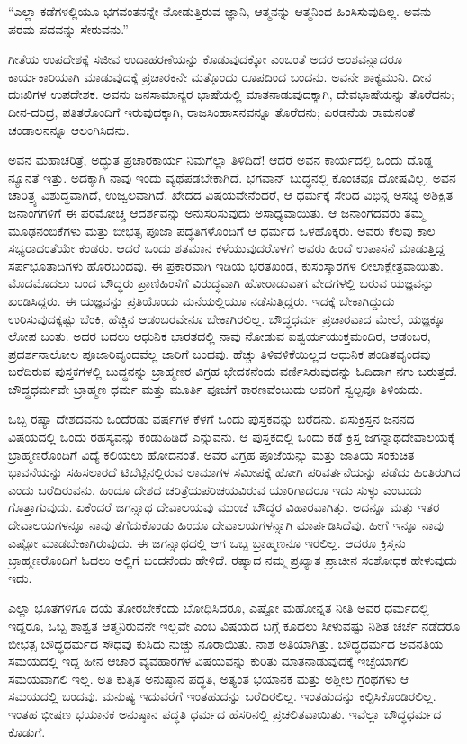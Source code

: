 “ಎಲ್ಲಾ ಕಡೆಗಳಲ್ಲಿಯೂ ಭಗವಂತನನ್ನೇ ನೋಡುತ್ತಿರುವ ಜ್ಞಾನಿ, ಆತ್ಮನನ್ನು ಆತ್ಮನಿಂದ ಹಿಂಸಿಸುವುದಿಲ್ಲ. ಅವನು ಪರಮ ಪದವನ್ನು ಸೇರುವನು.”

ಗೀತೆಯ ಉಪದೇಶಕ್ಕೆ ಸಜೀವ ಉದಾಹರಣೆಯನ್ನು ಕೊಡುವುದಕ್ಕೋ ಎಂಬಂತೆ ಅದರ ಅಂಶವನ್ನಾದರೂ ಕಾರ್ಯಕಾರಿಯಾಗಿ ಮಾಡುವುದಕ್ಕೆ ಪ್ರಚಾರಕನೇ ಮತ್ತೊಂದು ರೂಪದಿಂದ ಬಂದನು. ಅವನೇ ಶಾಕ್ಯಮುನಿ. ದೀನ ದುಃಖಿಗಳ ಉಪದೇಶಕ. ಅವನು ಜನಸಾಮಾನ್ಯರ ಭಾಷೆಯಲ್ಲಿ ಮಾತನಾಡುವುದಕ್ಕಾಗಿ, ದೇವಭಾಷೆಯನ್ನು ತೊರೆದನು; ದೀನ-ದರಿದ್ರ, ಪತಿತರೊಂದಿಗೆ ಇರುವುದಕ್ಕಾಗಿ, ರಾಜಸಿಂಹಾಸನವನ್ನೂ ತೊರೆದನು; ಎರಡನೆಯ ರಾಮನಂತೆ ಚಂಡಾಲನನ್ನೂ ಆಲಂಗಿಸಿದನು.

ಅವನ ಮಹಾಚರಿತ್ರೆ, ಅದ್ಭುತ ಪ್ರಚಾರಕಾರ್ಯ ನಿಮಗೆಲ್ಲಾ ತಿಳಿದಿದೆ! ಆದರೆ ಅವನ ಕಾರ್ಯದಲ್ಲಿ ಒಂದು ದೊಡ್ಡ ನ್ಯೂನತೆ ಇತ್ತು. ಅದಕ್ಕಾಗಿ ನಾವು ಇಂದು ವ್ಯಥೆಪಡಬೇಕಾಗಿದೆ. ಭಗವಾನ್​ ಬುದ್ಧನಲ್ಲಿ ಕೊಂಚವೂ ದೋಷವಿಲ್ಲ. ಅವನ ಚಾರಿತ್ರ್ಯ ವಿಶುದ್ಧವಾಗಿದೆ, ಉಜ್ವಲವಾಗಿದೆ. ಖೇದದ ವಿಷಯವೇನೆಂದರೆ, ಆ ಧರ್ಮಕ್ಕೆ ಸೇರಿದ ವಿಭಿನ್ನ ಅಸಭ್ಯ ಅಶಿಕ್ಷಿತ ಜನಾಂಗಗಳಿಗೆ ಈ ಪರಮೋಚ್ಚ ಆದರ್ಶವನ್ನು ಅನುಸರಿಸುವುದು ಅಸಾಧ್ಯವಾಯಿತು. ಆ ಜನಾಂಗದವರು ತಮ್ಮ ಮೂಢನಂಬಿಕೆಗಳು ಮತ್ತು ಬೀಭತ್ಸ ಪೂಜಾ ಪದ್ಧತಿಗಳೊಂದಿಗೆ ಆ ಧರ್ಮದ ಒಳಹೊಕ್ಕರು. ಅವರು ಕೆಲವು ಕಾಲ ಸಭ್ಯ\-ರಾದಂತೆಯೇ ಕಂಡರು. ಆದರೆ ಒಂದು ಶತಮಾನ ಕಳೆಯುವುದರೊಳಗೆ ಅವರು ಹಿಂದೆ ಉಪಾಸನೆ ಮಾಡುತ್ತಿದ್ದ ಸರ್ಪಭೂತಾದಿಗಳು ಹೊರಬಂದವು. ಈ ಪ್ರಕಾರವಾಗಿ ಇಡಿಯ ಭರತಖಂಡ, ಕುಸಂಸ್ಕಾರಗಳ ಲೀಲಾಕ್ಷೇತ್ರವಾಯಿತು. ಮೊದಮೊದಲು ಬಂದ ಬೌದ್ಧರು ಪ್ರಾಣಿಹಿಂಸೆಗೆ ವಿರುದ್ಧವಾಗಿ ಹೋರಾಡುವಾಗ ವೇದಗಳಲ್ಲಿ ಬರುವ ಯಜ್ಞವನ್ನು ಖಂಡಿಸಿದ್ದರು. ಈ ಯಜ್ಞವನ್ನು ಪ್ರತಿಯೊಂದು ಮನೆಯಲ್ಲಿಯೂ ನಡೆಸುತ್ತಿದ್ದರು. ಇದಕ್ಕೆ ಬೇಕಾಗಿದ್ದುದು ಉರಿಸುವುದಕ್ಕಷ್ಟು ಬೆಂಕಿ, ಹೆಚ್ಚಿನ ಆಡಂಬರವೇನೂ ಬೇಕಾಗಿರಲಿಲ್ಲ. ಬೌದ್ಧಧರ್ಮ ಪ್ರಚಾರವಾದ ಮೇಲೆ, ಯಜ್ಞಕ್ಕೂ ಲೋಪ ಬಂತು. ಅದರ ಬದಲು ಆಧುನಿಕ ಭಾರತದಲ್ಲಿ ನಾವು ನೋಡುವ ಐಶ್ವರ್ಯಯುಕ್ತಮಂದಿರ, ಆಡಂಬರ, ಪ್ರದರ್ಶನಾಲೋಲ ಪೂಜಾರಿವೃಂದವೆಲ್ಲ ಜಾರಿಗೆ ಬಂದವು. ಹೆಚ್ಚು ತಿಳಿವಳಿಕೆಯಿಲ್ಲದ ಆಧುನಿಕ ಪಂಡಿತವೃಂದವು ಬರೆದಿರುವ ಪುಸ್ತಕಗಳಲ್ಲಿ ಬುದ್ಧನನ್ನು ಬ್ರಾಹ್ಮಣರ ವಿಗ್ರಹ ಭೇದಕನೆಂದು ವರ್ಣಿಸಿರುವುದನ್ನು ಓದಿದಾಗ ನಗು ಬರುತ್ತದೆ. ಬೌದ್ಧಧರ್ಮವೇ ಬ್ರಾಹ್ಮಣ ಧರ್ಮ ಮತ್ತು ಮೂರ್ತಿ ಪೂಜೆಗೆ ಕಾರಣವೆಂಬುದು ಅವರಿಗೆ ಸ್ವಲ್ಪವೂ ತಿಳಿಯದು.

ಒಬ್ಬ ರಷ್ಯಾ ದೇಶದವನು ಒಂದೆರಡು ವರ್ಷಗಳ ಕೆಳಗೆ ಒಂದು ಪುಸ್ತಕವನ್ನು ಬರೆದನು. ಏಸುಕ್ರಿಸ್ತನ ಜನನದ ವಿಷಯದಲ್ಲಿ ಒಂದು ರಹಸ್ಯವನ್ನು ಕಂಡುಹಿಡಿದೆ ಎನ್ನುವನು. ಆ ಪುಸ್ತಕದಲ್ಲಿ ಒಂದು ಕಡೆ ಕ್ರಿಸ್ತ ಜಗನ್ನಾಥ\break ದೇವಾಲಯಕ್ಕೆ ಬ್ರಾಹ್ಮಣರೊಂದಿಗೆ ವಿದ್ಯೆ ಕಲಿಯಲು ಹೋದನಂತೆ. ಅವರ ವಿಗ್ರಹ ಪೂಜೆಯನ್ನು ಮತ್ತು ಜಾತಿಯ ಸಂಕುಚಿತ ಭಾವನೆಯನ್ನು ಸಹಿಸಲಾರದೆ ಟಿಬೆಟ್ಟಿನಲ್ಲಿರುವ ಲಾಮಾಗಳ ಸಮೀಪಕ್ಕೆ ಹೋಗಿ ಪರಿವರ್ತನೆಯನ್ನು ಪಡೆದು ಹಿಂತಿರುಗಿದ ಎಂದು ಬರೆದಿರುವನು. ಹಿಂದೂ ದೇಶದ ಚರಿತ್ರೆಯ\break ಪರಿಚಯವಿರುವ ಯಾರಿಗಾದರೂ ಇದು ಸುಳ್ಳು ಎಂಬುದು ಗೊತ್ತಾಗುವುದು. ಏಕೆಂದರೆ ಜಗನ್ನಾಥ ದೇವಾಲಯವು ಮುಂಚೆ ಬೌದ್ಧರ ವಿಹಾರವಾಗಿತ್ತು. ಅದನ್ನೂ ಮತ್ತು ಇತರ ದೇವಾಲಯಗಳನ್ನೂ ನಾವು ತೆಗೆದುಕೊಂಡು ಹಿಂದೂ ದೇವಾಲಯಗಳನ್ನಾಗಿ ಮಾರ್ಪಡಿಸಿದೆವು. ಹೀಗೆ ಇನ್ನೂ ನಾವು ಎಷ್ಟೋ ಮಾಡಬೇಕಾಗಿರುವುದು. ಈ ಜಗನ್ನಾಥದಲ್ಲಿ ಆಗ ಒಬ್ಬ ಬ್ರಾಹ್ಮಣನೂ ಇರಲಿಲ್ಲ. ಆದರೂ ಕ್ರಿಸ್ತನು ಬ್ರಾಹ್ಮಣರೊಂದಿಗೆ ಓದಲು ಅಲ್ಲಿಗೆ ಬಂದನೆಂದು ಹೇಳಿದೆ. ರಷ್ಯಾದ ನಮ್ಮ ಪ್ರಖ್ಯಾತ ಪ್ರಾಚೀನ ಸಂಶೋಧಕ ಹೇಳುವುದು ಇದು.

ಎಲ್ಲಾ ಭೂತಗಳಿಗೂ ದಯೆ ತೋರಬೇಕೆಂದು ಬೋಧಿಸಿದರೂ, ಎಷ್ಟೋ ಮಹೋನ್ನತ ನೀತಿ ಅವರ ಧರ್ಮದಲ್ಲಿ ಇದ್ದರೂ, ಒಬ್ಬ ಶಾಶ್ವತ ಆತ್ಮನಿರುವನೇ ಇಲ್ಲವೇ ಎಂಬ ವಿಷಯದ ಬಗ್ಗೆ ಕೂದಲು ಸೀಳುವಷ್ಟು ನಿಶಿತ ಚರ್ಚೆ ನಡೆದರೂ ಬೀಭತ್ಸ ಬೌದ್ಧಧರ್ಮದ ಸೌಧವು ಕುಸಿದು ನುಚ್ಚು ನೂರಾಯಿತು. ನಾಶ ಅತಿಯಾಗಿತ್ತು. ಬೌದ್ಧಧರ್ಮದ ಅವನತಿಯ ಸಮಯದಲ್ಲಿ ಇದ್ದ ಹೀನ ಆಚಾರ ವ್ಯವಹಾರಗಳ ವಿಷಯವನ್ನು ಕುರಿತು ಮಾತನಾಡುವುದಕ್ಕೆ ಇಚ್ಛೆಯಾಗಲಿ ಸಮಯವಾಗಲಿ ಇಲ್ಲ. ಅತಿ ಕುತ್ಸಿತ ಅನುಷ್ಠಾನ ಪದ್ಧತಿ, ಅತ್ಯಂತ ಭಯಾನಕ ಮತ್ತು ಅಶ್ಲೀಲ ಗ್ರಂಥಗಳು ಆ ಸಮಯದಲ್ಲಿ ಬಂದವು. ಮನುಷ್ಯ ಇದುವರೆಗೆ ಇಂತಹುದನ್ನು ಬರೆದಿರಲಿಲ್ಲ. ಇಂತಹುದನ್ನು ಕಲ್ಪಿಸಿಕೊಂಡಿರಲಿಲ್ಲ. ಇಂತಹ ಭೀಷಣ ಭಯಾನಕ ಅನುಷ್ಠಾನ ಪದ್ಧತಿ ಧರ್ಮದ ಹೆಸರಿನಲ್ಲಿ ಪ್ರಚಲಿತವಾಯಿತು. ಇವೆಲ್ಲಾ ಬೌದ್ಧಧರ್ಮದ ಕೊಡುಗೆ.

